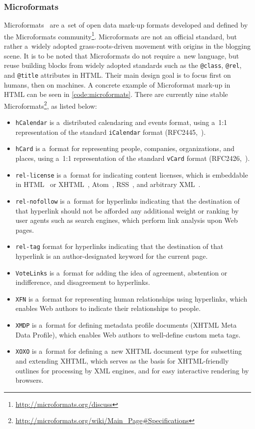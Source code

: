 \subsubsection{Microformats}
Microformats~\cite{Celik2006} are a~set of open data mark-up formats developed
and defined by the Microformats community\footnote{\url{http://microformats.org/discuss}}.
Microformats are not an official standard, but rather a~widely adopted grass-roots-driven movement
with origins in the blogging scene.
It is to be noted that Microformats do not require a~new language,
but reuse building blocks from widely adopted standards such as the \texttt{@class},
\texttt{@rel}, and \texttt{@title} attributes in HTML.
Their main design goal is to focus first on humans, then on machines.
A concrete example of Microformat mark-up in HTML can be seen in \autoref{code:microformats}.
There are currently nine stable
Microformats\footnote{\url{http://microformats.org/wiki/Main_Page\#Specifications}},
as listed below:

\begin{itemize}
\item \texttt{hCalendar} is a~distributed calendaring and events format, using a~1:1 representation of the standard \texttt{iCalendar} format (RFC2445,~\cite{Dawson-1-1998}).
\item \texttt{hCard} is a~format for representing people, companies, organizations, and places, using a~1:1 representation of the standard \texttt{vCard} format (RFC2426,~\cite{Dawson-2-1998}).
\item \texttt{rel-license} is a~format for indicating content licenses, which is embeddable in HTML~\cite{LeHors1999} or XHTML~\cite{Pemberton2000}, Atom~\cite{Nottingham2005}, RSS~\cite{Cadenhead2006}, and arbitrary XML~\cite{Bray1998}.
\item \texttt{rel-nofollow} is a~format for hyperlinks indicating that the destination of that hyperlink should not be afforded any additional weight or ranking by user agents such as search engines, which perform link analysis upon Web pages.
\item \texttt{rel-tag} format for hyperlinks indicating that the destination of that hyperlink is an author-designated keyword for the current page.
\item \texttt{VoteLinks} is a~format for adding the idea of agreement, abstention or indifference, and disagreement to hyperlinks.
\item \texttt{XFN} is a~format for representing human relationships using hyperlinks, which enables Web authors to indicate their relationships to people.
\item \texttt{XMDP} is a~format for defining metadata profile documents (XHTML Meta Data Profile), which enables Web authors to well-define custom meta tags.
\item \texttt{XOXO} is a~format for defining a~new XHTML document type for subsetting and extending XHTML, which serves as the basis for XHTML-friendly outlines for processing by XML engines, and for easy interactive rendering by browsers.
\end{itemize}


